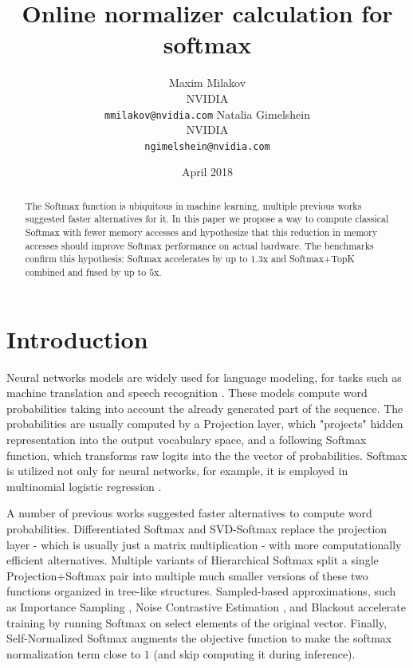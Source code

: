\documentclass{article}
\title{Online normalizer calculation for softmax}
\author{
	Maxim Milakov\\
    NVIDIA\\
    \texttt{mmilakov@nvidia.com}
    \And
    Natalia Gimelshein\\
    NVIDIA\\
    \texttt{ngimelshein@nvidia.com}
}
\date{April 2018}
\begin{document}
\maketitle

\begin{abstract}

The Softmax function is ubiquitous in machine learning, multiple previous works suggested faster alternatives for it. In this paper we propose a way to compute classical Softmax with fewer memory accesses and hypothesize that this reduction in memory accesses should improve Softmax performance on actual hardware. The benchmarks confirm this hypothesis: Softmax accelerates by up to $1.3$x and Softmax+TopK combined and fused by up to $5$x. 

\end{abstract}

\section{Introduction}

Neural networks models are widely used for language modeling, for tasks such as machine translation \cite{2014arXiv1409.3215S} and speech recognition \cite{6296526}. These models compute word probabilities taking into account the already generated part of the sequence. The probabilities are usually computed by a Projection layer, which "projects" hidden representation into the output vocabulary space, and a following Softmax function, which transforms raw logits into the the vector of probabilities. Softmax is utilized not only for neural networks, for example, it is employed in multinomial logistic regression \cite{PolytomousLR}.

A number of previous works suggested faster alternatives to compute word probabilities. Differentiated Softmax \cite{2015arXiv151204906C} and SVD-Softmax \cite{NIPS2017_7130} replace the projection layer - which is usually just a matrix multiplication - with more computationally efficient alternatives. Multiple variants of Hierarchical Softmax \cite{conf_icassp_Goodman01, 5947611, 2016arXiv160904309G} split a single Projection+Softmax pair into multiple much smaller versions of these two functions organized in tree-like structures. Sampled-based approximations, such as Importance Sampling \cite{Bengio+Senecal-2003}, Noise Contrastive Estimation \cite{2012arXiv1206.6426M}, and Blackout \cite{2015arXiv151106909J} accelerate training by running Softmax on select elements of the original vector. Finally, Self-Normalized Softmax \cite{Devlin14fastand} augments the objective function to make the softmax normalization term close to $1$ (and skip computing it during inference).
\end{document}
